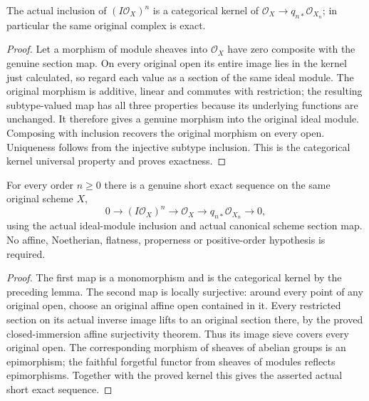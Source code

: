 \begin{lemma}
\label{lem:fibre-infinitesimal-categorical-kernel}
\leanok
The actual inclusion of $(I\mathcal O_X)^n$ is a categorical kernel
of $\mathcal O_X\to q_{n*}\mathcal O_{X_n}$; in particular the same
original complex is exact.
\end{lemma}
\begin{proof}
Let a morphism of module sheaves into $\mathcal O_X$ have zero composite
with the genuine section map. On every original open its entire image
lies in the kernel just calculated, so regard each value as a section
of the same ideal module. The original morphism is additive, linear and
commutes with restriction; the resulting subtype-valued map has all
three properties because its underlying functions are unchanged. It
therefore gives a genuine morphism into the original ideal module.
Composing with inclusion recovers the original morphism on every open.
Uniqueness follows from the injective subtype inclusion. This is the
categorical kernel universal property and proves exactness.
\end{proof}

\begin{proposition}
\label{prop:fibre-infinitesimal-module-short-exact}
\leanok
For every order $n\ge0$ there is a genuine short exact sequence on the
same original scheme $X$,
\[
 0\longrightarrow (I\mathcal O_X)^n\longrightarrow\mathcal O_X
 \longrightarrow q_{n*}\mathcal O_{X_n}\longrightarrow0,
\]
using the actual ideal-module inclusion and actual canonical scheme
section map. No affine, Noetherian, flatness, properness or
positive-order hypothesis is required.
\end{proposition}
\begin{proof}
The first map is a monomorphism and is the categorical kernel by the
preceding lemma. The second map is locally surjective: around every
point of any original open, choose an original affine open contained
in it. Every restricted section on its actual inverse image lifts to
an original section there, by the proved closed-immersion affine
surjectivity theorem. Thus its image sieve covers every original open.
The corresponding morphism of sheaves of abelian groups is an
epimorphism; the faithful forgetful functor from sheaves of modules
reflects epimorphisms. Together with the proved kernel this gives the
asserted actual short exact sequence.
\end{proof}



